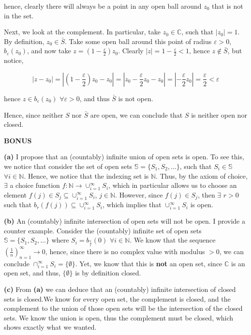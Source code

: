 \documentclass[10pt]{article}
\newcommand{\C}{\mathbb{C}}
\newcommand{\N}{\mathbb{N}}
\begin{document}
hence, clearly there will always be a point in any open ball around $z_{0}$ that is not in the set.

Next, we look at the complement. In particular, take $z_{0} \in \C$, such that $|z_{0}| = 1$. By definition, $z_{0} \in \bar{S}$. Take some open ball around this point of radius $\varepsilon > 0$, $b_{\varepsilon}(z_{0})$, and now take $z = (1-\frac{\varepsilon}{2})z_{0}$. Clearly $|z| = 1-\frac{\varepsilon}{2} < 1$, hence $z \notin \bar{S}$, but notice,

$$|z - z_{0}| = |(1-\frac{\varepsilon}{2})z_{0} - z_{0}| = |z_{0} - \frac{\varepsilon}{2}z_{0} - z_{0}| = |-\frac{\varepsilon}{2}z_{0}| = \frac{\varepsilon}{2} < \varepsilon$$

hence $z \in b_{\varepsilon}(z_{0})$ $\forall \varepsilon > 0$, and thus $\bar{S}$ is not open.

Hence, since neither $S$ nor $\bar{S}$ are open, we can conclude that $S$ is neither open nor closed.

\textbf{BONUS}

\textbf{(a)}
I propose that an (countably) infinite union of open sets is open. To see this, we notice that consider the set of open sets $\mathbb{S} = \{S_{1},S_{2}, \dots \}$, such that $S_{i} \in \mathbb{S}$ $\forall i\in \N$. Hence, we notice that the indexing set is $\N$. Thus, by the axiom of choice, $\exists$ a choice function $f: \N \to \cup_{i=1}^{\infty}S_{i}$, which in particular allows us to choose an element $f(j) \in S_{j} \subseteq \cup_{i=1}^{\infty}S_{i}$, $j \in \N$. However, since $f(j)\in S_{j}$, then $\exists$ $r > 0$ such that $b_{r}(f(j))\subseteq \cup_{i=1}^{\infty}S_{i}$, which implies that $\cup_{i=1}^{\infty}S_{i}$ is open.

\textbf{(b)} An (countably) infinite intersection of open sets will not be open. I provide a counter example. Consider the (countably) infinite set of open sets $\mathbb{S} = \{S_{1},S_{2}, \dots\}$ where $S_{i} = b_{\frac{1}{i}}(0)$ $\forall i \in \N$. We know that the sequence $(\frac{1}{n})_{n=1}^{\infty}\to 0$, hence, since there is no complex value with modulus $>0$, we can conclude $\cap_{i=1}^{\infty}S_{i} = \{\emptyset\}$. Yet, we know that this is \textbf{not} an open set, since $\C$ is an open set, and thus, $\{\emptyset\}$ is by definition closed.

\newpage

\textbf{(c)}
From \textbf{(a)} we can deduce that an (countably) infinite intersection of closed sets is closed.We know for every open set, the complement is closed, and the complement to the union of those open sets will be the intersection of the closed sets. We know the union is open, thus the complement must be closed, which shows exactly what we wanted.
\end{document}
